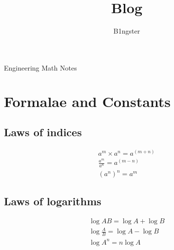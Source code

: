 \documentclass{article}
\title{Blog}
\author{B1ngster}
\date{}
\begin{document}
\begin{titlepage}
    \begin{adjustwidth}{-1in}{-1in} %
        \vskip2cm
        \noindent
        \huge{Engineering Math Notes}
        \vfill
        \vfill
    \end{adjustwidth}
\end{titlepage}


\newpage
\tableofcontents
\newpage

\section{Formalae and Constants}
\subsection*{Laws of indices}
$$
\begin{array}{l}
a^m \times a^n=a^{(m+n)} \\
\frac{a^m}{a^n}=a^{(m-n)} \\
\left(a^n\right)^n=a^m
\end{array}
$$


\subsection*{Laws of logarithms}
$$
\begin{array}{l}
\log A B=\log A+\log B \\
\log \frac{A}{B}=\log A-\log B \\
\log A^n=n \log A
\end{array}
$$
\end{document}
